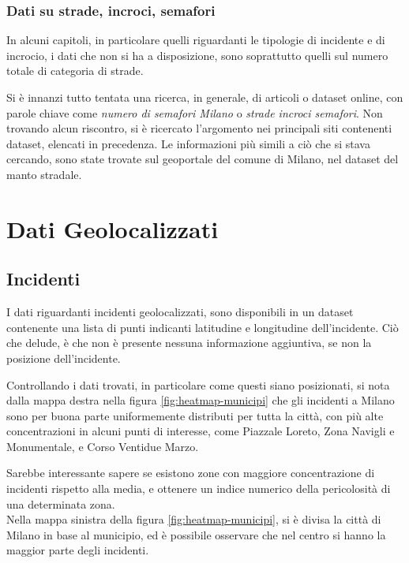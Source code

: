 \documentclass[a4paper]{report}
\begin{document}
\subsection{Dati su strade, incroci, semafori}

In alcuni capitoli, in particolare quelli riguardanti le tipologie di incidente e 
di incrocio, i dati che non si ha a disposizione, sono soprattutto quelli sul 
numero totale di categoria di strade.

Si è innanzi tutto tentata una ricerca, in generale, di articoli o dataset online, con 
parole chiave come \textit{numero di semafori Milano} o \textit{strade incroci semafori}.
Non trovando alcun riscontro, si è ricercato l'argomento nei principali siti contenenti 
dataset, elencati in precedenza. 
Le informazioni più simili a ciò che si stava cercando, sono state trovate sul geoportale 
del comune di Milano, nel dataset del manto stradale.

\chapter{Dati Geolocalizzati}

\section{Incidenti}

I dati riguardanti incidenti geolocalizzati, sono disponibili in un dataset contenente una 
lista di punti indicanti latitudine e longitudine dell'incidente. 
Ciò che delude, è che non è presente nessuna informazione aggiuntiva, se non la posizione 
dell'incidente.

Controllando i dati trovati, in particolare come questi siano posizionati, 
si nota dalla mappa destra nella figura \ref{fig:heatmap-municipi} che gli incidenti a Milano 
sono per buona parte uniformemente distributi per tutta la città, 
con più alte concentrazioni in alcuni punti di interesse, come Piazzale Loreto, Zona Navigli 
e Monumentale, e Corso Ventidue Marzo.

Sarebbe interessante sapere se esistono zone con maggiore concentrazione di incidenti rispetto 
alla media, e ottenere un indice numerico della pericolosità di una determinata zona.\\

Nella mappa sinistra della figura \ref{fig:heatmap-municipi}, si è divisa la città di Milano 
in base al municipio, ed è possibile osservare che nel centro si hanno la maggior parte degli 
incidenti.
\end{document}
